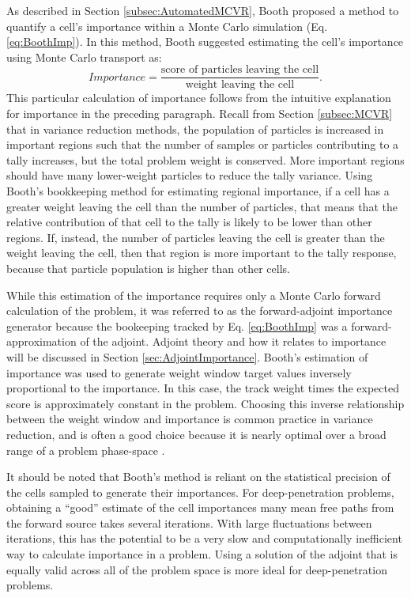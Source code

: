 As described in Section \ref{subsec:AutomatedMCVR}, Booth
\cite{booth_automatic_1982} proposed
a method to quantify a cell's importance within a Monte Carlo simulation
(Eq. \eqref{eq:BoothImp}). In
this method, Booth suggested estimating the cell's importance using Monte Carlo
transport as:
\begin{equation*}
  Importance  = \frac{\text{score of particles leaving the cell}}
                     {\text{weight leaving the cell}}.
\end{equation*}
This particular calculation of importance
follows from the intuitive explanation for importance in the preceding
paragraph. Recall from Section \ref{subsec:MCVR} that in variance reduction
methods, the population of particles is increased in important regions such that
the number of samples or particles contributing to a tally increases, but the
total problem weight is conserved. More important regions should have many
lower-weight particles to reduce the tally variance. Using Booth's bookkeeping
method for estimating regional importance,
if a cell has a greater weight leaving the cell than the number
of particles, that means that the relative contribution of that cell to the
tally is likely to be lower than other regions. If, instead, the number of
particles leaving the cell is greater than the weight leaving the cell, then
that region is more important to the tally response, because that particle
population is higher than other cells.

While this
estimation of the importance requires only a Monte Carlo forward calculation of
the problem, it was referred to as the forward-adjoint importance generator
\cite{booth_automatic_1982, booth_deep_1982, booth_importance_1984} because the
bookeeping tracked by Eq. \eqref{eq:BoothImp} was a forward-approximation of the
adjoint. Adjoint theory and how it relates to importance will be discussed in
Section
\ref{sec:AdjointImportance}.
Booth's estimation of importance was used to generate
weight window target values inversely proportional to the importance.
In this case, the track weight times the expected score is approximately
constant in the problem. Choosing this inverse relationship between the weight
window and importance is common practice in variance reduction, and is often a
good choice because it is nearly optimal over a broad range of a problem
phase-space \cite{booth_common_2012}.

It should be noted that Booth's method is reliant on the statistical
precision of the cells sampled to generate their importances. For
deep-penetration problems, obtaining a ``good'' estimate of the cell importances
many mean free paths from the forward source takes several iterations. With
large fluctuations between iterations, this has the potential to
be a very slow and
computationally inefficient way to calculate importance in a problem. Using a
solution of the adjoint that is equally valid across all of the problem space
is more ideal for deep-penetration problems.


